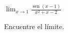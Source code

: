 \item $\displaystyle \lim_{x \to 1} \frac{\operatorname{sen}(x - 1)}{x^2 + x - 2}$
\par
Encuentre el límite.
